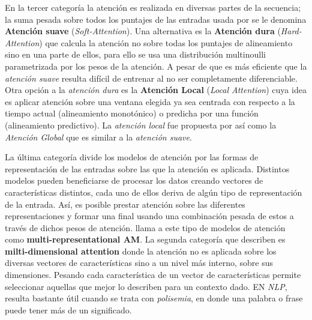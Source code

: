 En la tercer categoría la atención es realizada en diversas partes de la secuencia; la suma pesada sobre
todos los puntajes de las entradas usada por \citeauthor{bahdanau2016neural} se le denomina \textbf{
Atención suave} (\textit{Soft-Attention}). Una alternativa es la \textbf{Atención dura}
(\textit{Hard-Attention}) \cite{DBLP:journals/corr/XuBKCCSZB15} que calcula la atención no sobre todas
los puntajes de alineamiento sino en una parte de ellos, para ello se usa una distribución multinoulli
parametrizada por los pesos de la atención. A pesar de que es más eficiente que la
\textit{atención suave} resulta difícil de entrenar al no ser completamente diferenciable. Otra opción
a la \textit{atención dura} es la \textbf{Atención Local} (\textit{Local Attention}) cuya idea es aplicar
atención sobre una ventana elegida ya sea centrada con respecto a la tiempo actual (alineamiento monotónico)
o predicha por una función (alineamiento predictivo). La \textit{atención local} fue propuesta por
\citeauthor{DBLP:journals/corr/LuongPM15} así como la \textit{Atención Global} que es similar a la
\textit{atención suave}.

La última categoría divide los modelos de atención por las formas de representación de las entradas
sobre las que la atención es aplicada. Distintos modelos pueden beneficiarse de procesar los datos
creando vectores de características distintos, cada uno de ellos deriva de algún tipo de representación
de la entrada. Así, es posible prestar atención sobre las diferentes representaciones y formar una
final usando una combinación pesada de estos a través de dichos pesos de atención.
\citeauthor{DBLP:journals/corr/abs-1904-02874} llama a este tipo de modelos de atención como
\textbf{multi-representational AM}. La segunda categoría que describen es \textbf{milti-dimensional attention}
donde la atención no es aplicada sobre los diversas vectores de características sino a un nivel más interno,
sobre sus dimensiones. Pesando cada característica de un vector de características permite seleccionar
aquellas que mejor lo describen para un contexto dado. EN \textit{NLP}, resulta bastante útil cuando se trata
con \textit{polisemia}, en donde una palabra o frase puede tener más de un significado.
